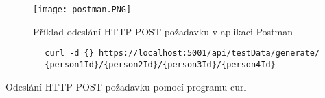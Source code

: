 \begin{figure}
	\centering
	\texttt{[image: postman.PNG]}
	\caption{Příklad odeslání HTTP POST požadavku v aplikaci Postman}
	\label{fig:Postman}
\end{figure}

\begin{program}
	\begin{lstlisting}
		curl -d {} https://localhost:5001/api/testData/generate/
		{person1Id}/{person2Id}/{person3Id}/{person4Id}
	\end{lstlisting}
	\caption{Odeslání HTTP POST požadavku pomocí programu curl}
	\label{curl}
\end{program}